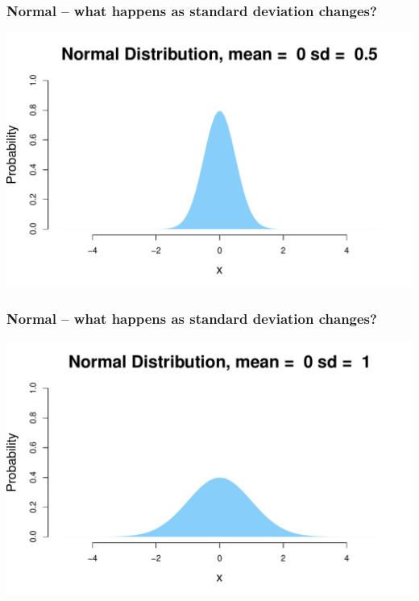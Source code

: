 \documentclass[aspectratio=169]{beamer}
\theoremstyle{principle}
\begin{document}
\begin{frame}
\frametitle{Normal -- what happens as standard deviation changes?}

\begin{center}
\includegraphics[scale=0.5]{Normal_0_0.5.pdf}
\end{center}

\end{frame}

\begin{frame}
\frametitle{Normal -- what happens as standard deviation changes?}

\begin{center}
\includegraphics[scale=0.5]{Normal_0_1.pdf}
\end{center}

\end{frame}
\end{document}
